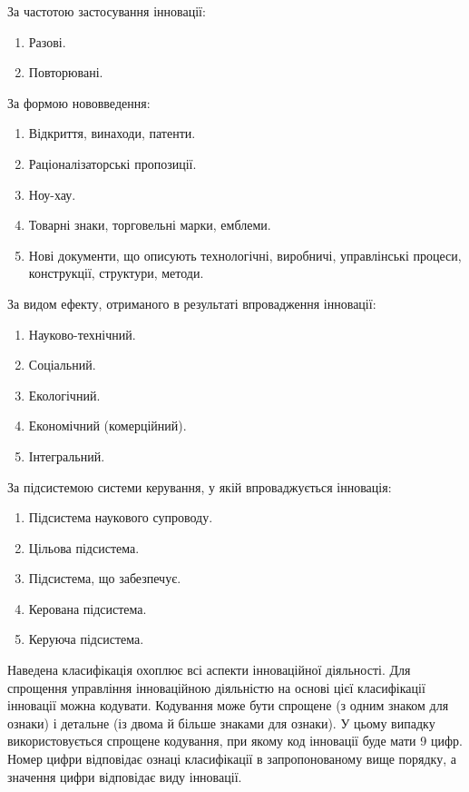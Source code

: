За частотою застосування інновації:

\begin{enumerate}
	\item Разові.
	\item Повторювані.
\end{enumerate}

За формою нововведення:

\begin{enumerate}
	\item Відкриття, винаходи, патенти.
	\item Раціоналізаторські пропозиції.
	\item Ноу-хау.
	\item Товарні знаки, торговельні марки, емблеми.
	\item Нові документи, що описують технологічні, виробничі, управлінські процеси, конструкції, структури, методи.
\end{enumerate}

За видом ефекту, отриманого в результаті впровадження інновації:

\begin{enumerate}
	\item Науково-технічний.
	\item Соціальний.
	\item Екологічний.
	\item Економічний (комерційний).
	\item Інтегральний.
\end{enumerate}

За підсистемою системи керування, у якій впроваджується інновація:

\begin{enumerate}
	\item Підсистема наукового супроводу.
	\item Цільова підсистема.
	\item Підсистема, що забезпечує.
	\item Керована підсистема.
	\item Керуюча підсистема.
\end{enumerate}

Наведена класифікація охоплює всі аспекти інноваційної діяльності. Для спрощення управління інноваційною діяльністю на основі цієї класифікації інновації можна кодувати. Кодування може бути спрощене (з одним знаком для ознаки) і детальне (із двома й більше знаками для ознаки). У цьому випадку використовується спрощене кодування, при якому код інновації буде мати 9 цифр. Номер цифри відповідає ознаці класифікації в запропонованому вище порядку, а значення цифри відповідає виду інновації.

